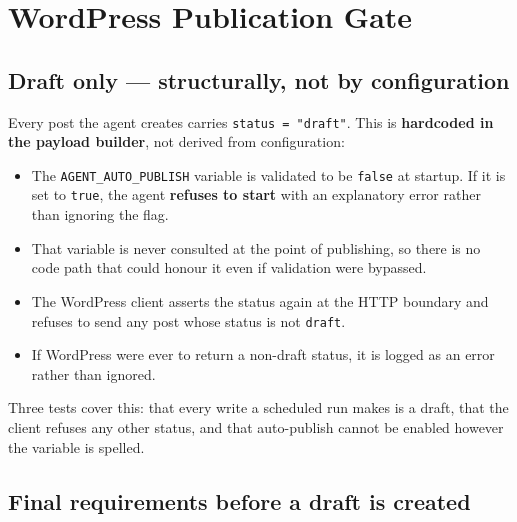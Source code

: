 \documentclass[11pt,a4paper]{article}
\newcommand{\var}[1]{\texttt{\small\hyphenpenalty=0\exhyphenpenalty=0\relax #1}}
\newcommand{\us}{\_\discretionary{}{}{}}
\newcommand{\brk}{\hyphenpenalty=0\exhyphenpenalty=0\relax}
\newcommand{\code}[1]{\texttt{\small\brk #1}}
\begin{document}
\section{WordPress Publication Gate}

\subsection{Draft only --- structurally, not by configuration}

\begin{blockbox}
Every post the agent creates carries \code{status = "draft"}. This is
\textbf{hardcoded in the payload builder}, not derived from configuration:
\begin{itemize}[leftmargin=1.2em,itemsep=0.15em,topsep=0.3em]
  \item The \var{AGENT\us AUTO\us PUBLISH} variable is validated to be \code{false}
    at startup. If it is set to \code{true}, the agent \textbf{refuses to start}
    with an explanatory error rather than ignoring the flag.
  \item That variable is never consulted at the point of publishing, so there is
    no code path that could honour it even if validation were bypassed.
  \item The WordPress client asserts the status again at the HTTP boundary and
    refuses to send any post whose status is not \code{draft}.
  \item If WordPress were ever to return a non-draft status, it is logged as an
    error rather than ignored.
\end{itemize}
Three tests cover this: that every write a scheduled run makes is a draft, that
the client refuses any other status, and that auto-publish cannot be enabled
however the variable is spelled.
\end{blockbox}

\subsection{Final requirements before a draft is created}
\end{document}

